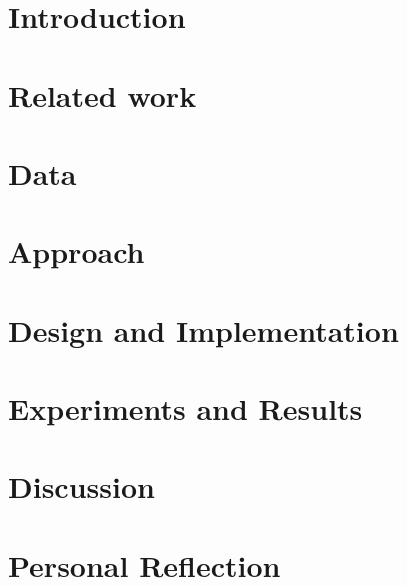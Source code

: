 \documentclass[12pt,twoside]{report}
\begin{document}




% 

\tableofcontents

\listoffigures



\chapter{Introduction}


\chapter{Related work}


\chapter{Data}


\chapter{Approach}


\chapter{Design and Implementation}


\chapter{Experiments and Results}


\chapter{Discussion}





\appendix
\chapter{Personal Reflection }

%
% 

\printbibliography
\end{document}
